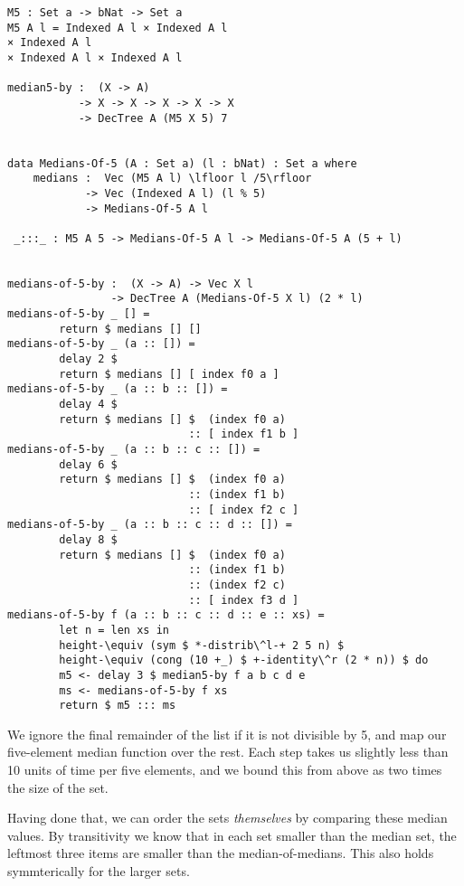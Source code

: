 \begin{lstlisting}[caption={Median of 5},label={lst:median:medofmeds},emph={M,median,by,medians,of}]
M5 : Set a -> bNat -> Set a
M5 A l = Indexed A l × Indexed A l
× Indexed A l
× Indexed A l × Indexed A l

median5-by :  (X -> A)
           -> X -> X -> X -> X -> X
           -> DecTree A (M5 X 5) 7


data Medians-Of-5 (A : Set a) (l : bNat) : Set a where
    medians :  Vec (M5 A l) \lfloor l /5\rfloor
            -> Vec (Indexed A l) (l % 5)
            -> Medians-Of-5 A l

 _:::_ : M5 A 5 -> Medians-Of-5 A l -> Medians-Of-5 A (5 + l)


medians-of-5-by :  (X -> A) -> Vec X l
                -> DecTree A (Medians-Of-5 X l) (2 * l)
medians-of-5-by _ [] =
        return $ medians [] []
medians-of-5-by _ (a :: []) =
        delay 2 $
        return $ medians [] [ index f0 a ]
medians-of-5-by _ (a :: b :: []) =
        delay 4 $
        return $ medians [] $  (index f0 a)
                            :: [ index f1 b ]
medians-of-5-by _ (a :: b :: c :: []) =
        delay 6 $
        return $ medians [] $  (index f0 a)
                            :: (index f1 b)
                            :: [ index f2 c ]
medians-of-5-by _ (a :: b :: c :: d :: []) =
        delay 8 $
        return $ medians [] $  (index f0 a)
                            :: (index f1 b)
                            :: (index f2 c)
                            :: [ index f3 d ]
medians-of-5-by f (a :: b :: c :: d :: e :: xs) =
        let n = len xs in
        height-\equiv (sym $ *-distrib\^l-+ 2 5 n) $
        height-\equiv (cong (10 +_) $ +-identity\^r (2 * n)) $ do
        m5 <- delay 3 $ median5-by f a b c d e
        ms <- medians-of-5-by f xs
        return $ m5 ::: ms

\end{lstlisting}

We ignore the final remainder of the list if it is not divisible by 5, and map our five-element median function over the rest. Each step takes us slightly less than 10 units of time per five elements, and we bound this from above as two times the size of the set.

Having done that, we can order the sets \emph{themselves} by comparing these median values. By transitivity we know that in each set smaller than the median set, the leftmost three items are smaller than the median-of-medians. This also holds symmterically for the larger sets. 

